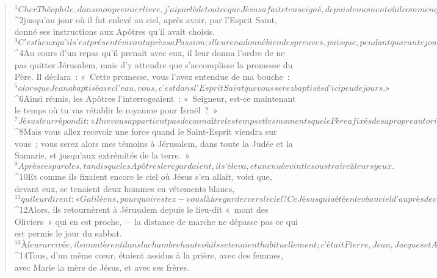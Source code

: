   
  
    
      
         
      \bchapter{}
      \begin{verse}
${}^{1}Cher Théophile, dans mon premier livre, j’ai parlé de tout ce que Jésus a fait et enseigné, depuis le moment où il commença, 
${}^{2}jusqu’au jour où il fut enlevé au ciel, après avoir, par l’Esprit Saint, donné ses instructions aux Apôtres qu’il avait choisis. 
${}^{3}C’est à eux qu’il s’est présenté vivant après sa Passion ; il leur en a donné bien des preuves, puisque, pendant quarante jours, il leur est apparu et leur a parlé du royaume de Dieu.
      
         
${}^{4}Au cours d’un repas qu’il prenait avec eux, il leur donna l’ordre de ne pas quitter Jérusalem, mais d’y attendre que s’accomplisse la promesse du Père. Il déclara : « Cette promesse, vous l’avez entendue de ma bouche : 
${}^{5}alors que Jean a baptisé avec l’eau, vous, c’est dans l’Esprit Saint que vous serez baptisés d’ici peu de jours. » 
${}^{6}Ainsi réunis, les Apôtres l’interrogeaient : « Seigneur, est-ce maintenant le temps où tu vas rétablir le royaume pour Israël ? » 
${}^{7}Jésus leur répondit : « Il ne vous appartient pas de connaître les temps et les moments que le Père a fixés de sa propre autorité. 
${}^{8}Mais vous allez recevoir une force quand le Saint-Esprit viendra sur vous ; vous serez alors mes témoins à Jérusalem, dans toute la Judée et la Samarie, et jusqu’aux extrémités de la terre. »
${}^{9}Après ces paroles, tandis que les Apôtres le regardaient, il s’éleva, et une nuée vint le soustraire à leurs yeux. 
${}^{10}Et comme ils fixaient encore le ciel où Jésus s’en allait, voici que, devant eux, se tenaient deux hommes en vêtements blancs, 
${}^{11}qui leur dirent : « Galiléens, pourquoi restez-vous là à regarder vers le ciel ? Ce Jésus qui a été enlevé au ciel d’auprès de vous, viendra de la même manière que vous l’avez vu s’en aller vers le ciel. »
${}^{12}Alors, ils retournèrent à Jérusalem depuis le lieu-dit « mont des Oliviers » qui en est proche, – la distance de marche ne dépasse pas ce qui est permis le jour du sabbat. 
${}^{13}À leur arrivée, ils montèrent dans la chambre haute où ils se tenaient habituellement ; c’était Pierre, Jean, Jacques et André, Philippe et Thomas, Barthélemy et Matthieu, Jacques fils d’Alphée, Simon le Zélote, et Jude fils de Jacques. 
${}^{14}Tous, d’un même cœur, étaient assidus à la prière, avec des femmes, avec Marie la mère de Jésus, et avec ses frères.

\end{verse}
